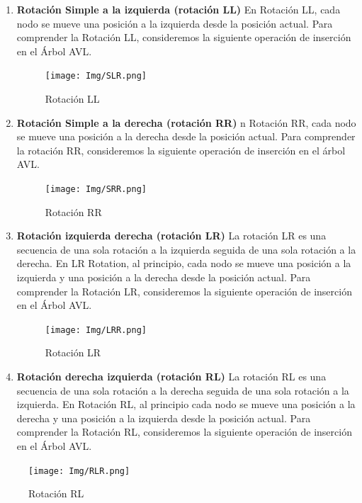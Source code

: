 \documentclass{article}
\begin{document}
\begin{enumerate}

		\item \textbf{Rotación Simple a la izquierda (rotación LL)}
		En Rotación LL, cada nodo se mueve una posición a la izquierda desde la posición actual. Para comprender la Rotación LL, consideremos la siguiente operación de inserción en el Árbol AVL.
		
		\begin{figure}[H]
\centering
\texttt{[image: Img/SLR.png]}
\caption{Rotación LL}
\end{figure}
		
		\item \textbf{Rotación Simple a la derecha (rotación RR)}
		n Rotación RR, cada nodo se mueve una posición a la derecha desde la posición actual. Para comprender la rotación RR, consideremos la siguiente operación de inserción en el árbol AVL.
		
		\begin{figure}[H]
\centering
\texttt{[image: Img/SRR.png]}
\caption{Rotación RR}
\end{figure}
		
		\item \textbf{Rotación izquierda derecha (rotación LR)}
		La rotación LR es una secuencia de una sola rotación a la izquierda seguida de una sola rotación a la derecha. En LR Rotation, al principio, cada nodo se mueve una posición a la izquierda y una posición a la derecha desde la posición actual. Para comprender la Rotación LR, consideremos la siguiente operación de inserción en el Árbol AVL.
		
		\begin{figure}[H]
\centering
\texttt{[image: Img/LRR.png]}
\caption{Rotación LR}
\end{figure}
		
		\item \textbf{Rotación derecha izquierda (rotación RL)}
		La rotación RL es una secuencia de una sola rotación a la derecha seguida de una sola rotación a la izquierda. En Rotación RL, al principio cada nodo se mueve una posición a la derecha y una posición a la izquierda desde la posición actual. Para comprender la Rotación RL, consideremos la siguiente operación de inserción en el Árbol AVL.
		\end{enumerate}
	\begin{figure}[H]
\centering
\texttt{[image: Img/RLR.png]}
\caption{Rotación RL}
\end{figure}		
		
\end{document}
